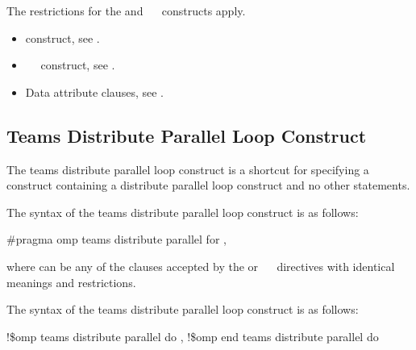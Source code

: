 {{{{\restrictions
The restrictions for the  and ~~ constructs apply.

\crossreferences
\begin{itemize}
\item {} construct, see 
.

\item {}~~ construct, see 
.

\item Data attribute clauses, see 
.
\end{itemize}











\subsection{Teams Distribute Parallel Loop Construct}
\label{subsec:Teams Distribute Parallel Loop Construct}
\summary
The teams distribute parallel loop construct is a shortcut for specifying a  
construct containing a distribute parallel loop construct and no other statements.

\syntax
\ccppspecificstart
The syntax of the teams distribute parallel loop construct is as follows:

\begin{boxedcode}[fontsize=\small]
\#pragma omp teams distribute parallel for \plc{[clause[ [},\plc{] clause] ...  ] new-line}
\end{boxedcode}

where  can be any of the clauses accepted by the  or 
~~ directives with identical meanings and restrictions.
\ccppspecificend

\fortranspecificstart
The syntax of the teams distribute parallel loop construct is as follows:

\begin{boxedcode}
!\$omp teams distribute parallel do \plc{[clause[ [},\plc{] clause] ... ]}
\plc{[} !\$omp end teams distribute parallel do \plc{]}
\end{boxedcode}

}}}}
